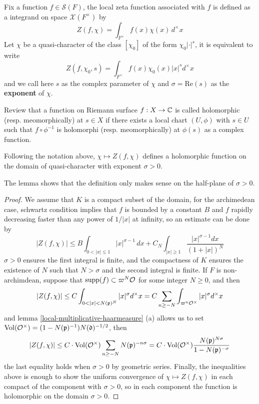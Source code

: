 \begin{definition}
    Fix a function \(f \in \mathcal{S}(F)\), the local zeta function associated with \(f\) is defined as a integrand on space \(\mathcal{X}(F^\times)\) by
\[Z(f,\chi) = \int_{F^\times} f(x)\chi(x) \, d^\times x\]
Let \(\chi\) be a quasi-character of the class \([\chi_0]\) of the form \(\chi_0|\cdot|^s\), it is equivalent to write
\[Z(f,\chi_0,s) = \int_{F^\times} f(x)\chi_0(x)|x|^s d^\times x\]
and we call here \(s\) as the complex parameter of \(\chi\) and \(\sigma = \mathrm{Re}(s)\) as the \textbf{exponent} of \(\chi\).
\end{definition}

Review that a function on Riemann surface \(f: X \to \mathbb{C}\) is called holomorphic (resp. meomorphically) at \(s \in X\) if there exists a local chart \((U,\phi)\) with \(s \in U\) such that \(f \circ \phi^{-1}\) is holomorphi (resp. meomorphically) at \(\phi(s)\) as a complex function.

\begin{lemma} \label{holomorphic-halfplane}
    Following the notation above, \(\chi \mapsto Z(f,\chi)\) defines a holomorphic function on the domain of quasi-character with exponent \(\sigma > 0 \).
\end{lemma}

The lemma shows that the definition only makes sense on the half-plane of \(\sigma > 0\).

\begin{proof}
    We assume that \(K\) is a compact subset of the domain, for the archimedean case, schwartz condition implies that \(f\) is bounded by a constant \(B\) and \(f\) rapidly decreasing faster than any power of \(1/|x|\) at infinity, so an estimate can be done by
    \[|Z(f,\chi)| \leq B \int_{0< |x| \leq 1}|x|^{\sigma -1} \,d x + C_N\int_{|x| \geq 1} \frac{|x|^{\sigma-1} d x}{(1+ |x|)^N}\]
    \(\sigma>0\) ensures the first integral is finite, and the compactness of \(K\) ensures the existence of \(N\) such that \(N > \sigma\) and the second integral is finite. If \(F\) is non-archimdean, suppose that \(\mathrm{supp}(f) \subset \varpi^N \mathcal{O}\) for some integer \(N \geq 0\), and then 
    \[|Z(f,\chi)| \leq C \int_{0<|x|<N(\pp)^N}|x|^{\sigma} d^\times x  = C \sum_{n \geq -N}\int_{\varpi^n \oo^\times}|x|^{\sigma} d^\times x\]
    and lemma \ref{local-multiplicative-haarmeasure} (a) allows us to set \(\mathrm{Vol}(\mathcal{O}^\times) = (1-N(\mathfrak{p})^{-1})N(\mathfrak{d})^{-1/2}\), then
    \[|Z(f,\chi)| \leq C \cdot \mathrm{Vol}(\mathcal{O}^\times) \sum_{n \geq -N}N(\mathfrak{p})^{-n \sigma}  = C \cdot \mathrm{Vol}(\mathcal{O}^\times) \frac{N(\mathfrak{p})^{N\sigma}}{1-N(\mathfrak{p})^{-\sigma}}\]
    the last equality holds when \(\sigma>0\) by geometric series. Finally, the inequalities above is enough to show the uniform convergence of \(\chi \mapsto Z(f,\chi)\) in each compact of the component with \(\sigma>0\), so in each component the function is holomorphic on the domain  \(\sigma>0\).
\end{proof}

